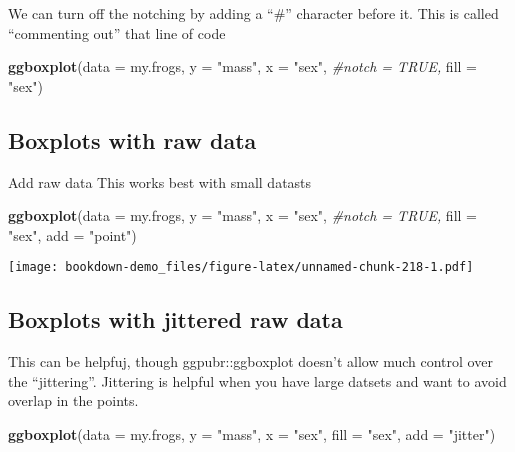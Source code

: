 \documentclass[]{book}
\newenvironment{Shaded}{\begin{snugshade}}{\end{snugshade}}
\newcommand{\KeywordTok}[1]{\textcolor[rgb]{0.13,0.29,0.53}{\textbf{#1}}}
\newcommand{\DataTypeTok}[1]{\textcolor[rgb]{0.13,0.29,0.53}{#1}}
\newcommand{\StringTok}[1]{\textcolor[rgb]{0.31,0.60,0.02}{#1}}
\newcommand{\CommentTok}[1]{\textcolor[rgb]{0.56,0.35,0.01}{\textit{#1}}}
\newcommand{\NormalTok}[1]{#1}
\theoremstyle{definition}
\theoremstyle{definition}
\theoremstyle{definition}
\theoremstyle{remark}
\begin{document}
We can turn off the notching by adding a ``\#'' character before it.
This is called ``commenting out'' that line of code

\begin{Shaded}
\begin{Highlighting}[]
\KeywordTok{ggboxplot}\NormalTok{(}\DataTypeTok{data =}\NormalTok{ my.frogs,}
          \DataTypeTok{y =} \StringTok{"mass"}\NormalTok{,}
          \DataTypeTok{x =} \StringTok{"sex"}\NormalTok{,}
          \CommentTok{#notch  = TRUE,}
          \DataTypeTok{fill =} \StringTok{"sex"}\NormalTok{)}
\end{Highlighting}
\end{Shaded}

\subsection{Boxplots with raw data}\label{boxplots-with-raw-data}

Add raw data This works best with small datasts

\begin{Shaded}
\begin{Highlighting}[]
\KeywordTok{ggboxplot}\NormalTok{(}\DataTypeTok{data =}\NormalTok{ my.frogs,}
          \DataTypeTok{y =} \StringTok{"mass"}\NormalTok{,}
          \DataTypeTok{x =} \StringTok{"sex"}\NormalTok{,}
          \CommentTok{#notch  = TRUE,}
          \DataTypeTok{fill =} \StringTok{"sex"}\NormalTok{,}
          \DataTypeTok{add =} \StringTok{"point"}\NormalTok{)}
\end{Highlighting}
\end{Shaded}

\texttt{[image: bookdown-demo\_files/figure-latex/unnamed-chunk-218-1.pdf]}

\subsection{Boxplots with jittered raw
data}\label{boxplots-with-jittered-raw-data}

This can be helpfuj, though ggpubr::ggboxplot doesn't allow much control
over the ``jittering''. Jittering is helpful when you have large datsets
and want to avoid overlap in the points.

\begin{Shaded}
\begin{Highlighting}[]
\KeywordTok{ggboxplot}\NormalTok{(}\DataTypeTok{data =}\NormalTok{ my.frogs,}
          \DataTypeTok{y =} \StringTok{"mass"}\NormalTok{,}
          \DataTypeTok{x =} \StringTok{"sex"}\NormalTok{,}
          \DataTypeTok{fill =} \StringTok{"sex"}\NormalTok{,}
          \DataTypeTok{add =} \StringTok{"jitter"}\NormalTok{)}
\end{Highlighting}
\end{Shaded}
\end{document}
